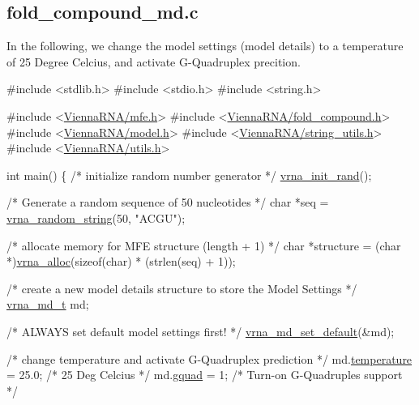\subsection*{fold\+\_\+compound\+\_\+md.\+c }

In the following, we change the model settings (model details) to a temperature of 25 Degree Celcius, and activate G-\/\+Quadruplex precition.


\begin{DoxyCodeInclude}
\textcolor{preprocessor}{#include <stdlib.h>}
\textcolor{preprocessor}{#include <stdio.h>}
\textcolor{preprocessor}{#include <string.h>}

\textcolor{preprocessor}{#include <\mbox{\hyperlink{mfe_8h}{ViennaRNA/mfe.h}}>}
\textcolor{preprocessor}{#include <\mbox{\hyperlink{fold__compound_8h}{ViennaRNA/fold\_compound.h}}>}
\textcolor{preprocessor}{#include <\mbox{\hyperlink{model_8h}{ViennaRNA/model.h}}>}
\textcolor{preprocessor}{#include <\mbox{\hyperlink{string__utils_8h}{ViennaRNA/string\_utils.h}}>}
\textcolor{preprocessor}{#include <\mbox{\hyperlink{utils_8h}{ViennaRNA/utils.h}}>}

\textcolor{keywordtype}{int}
main()
\{
  \textcolor{comment}{/* initialize random number generator */}
  \mbox{\hyperlink{group__utils_ga0ad1f40ea316e5c5918695c35613027a}{vrna\_init\_rand}}();

  \textcolor{comment}{/* Generate a random sequence of 50 nucleotides */}
  \textcolor{keywordtype}{char}      *seq = \mbox{\hyperlink{group__string__utils_ga4eeb3750dcf860b9f3158249f95dbd7f}{vrna\_random\_string}}(50, \textcolor{stringliteral}{"ACGU"});

  \textcolor{comment}{/* allocate memory for MFE structure (length + 1) */}
  \textcolor{keywordtype}{char}      *structure = (\textcolor{keywordtype}{char} *)\mbox{\hyperlink{group__utils_gaf37a0979367c977edfb9da6614eebe99}{vrna\_alloc}}(\textcolor{keyword}{sizeof}(\textcolor{keywordtype}{char}) * (strlen(seq) + 1));

  \textcolor{comment}{/* create a new model details structure to store the Model Settings */}
  \mbox{\hyperlink{group__model__details_structvrna__md__s}{vrna\_md\_t}} md;

  \textcolor{comment}{/* ALWAYS set default model settings first! */}
  \mbox{\hyperlink{group__model__details_ga8ac6ff84936282436f822644bf841f66}{vrna\_md\_set\_default}}(&md);

  \textcolor{comment}{/* change temperature and activate G-Quadruplex prediction */}
  md.\mbox{\hyperlink{group__model__details_a5f7e5c2b65bada5188443470e576aa4b}{temperature}}  = 25.0; \textcolor{comment}{/* 25 Deg Celcius */}
  md.\mbox{\hyperlink{group__model__details_af88a511a2b1f526b4c6213de6cb8fd6e}{gquad}}        = 1;    \textcolor{comment}{/* Turn-on G-Quadruples support */}


\end{DoxyCodeInclude}
